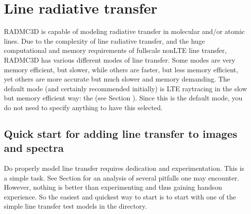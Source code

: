 \documentclass[letterpaper,10pt,english]{sphinxmanual}
\begin{document}
\chapter{Line radiative transfer}
\label{\detokenize{lineradtrans:line-radiative-transfer}}\label{\detokenize{lineradtrans:chap-line-transfer}}\label{\detokenize{lineradtrans::doc}}
RADMC\sphinxhyphen{}3D is capable of modeling radiative transfer in molecular and/or
atomic lines. Due to the complexity of line radiative transfer, and the huge
computational and memory requirements of full\sphinxhyphen{}scale non\sphinxhyphen{}LTE line transfer,
RADMC\sphinxhyphen{}3D has various different modes of line transfer. Some modes are very
memory efficient, but slower, while others are faster, but less memory
efficient, yet others are more accurate but much slower and memory
demanding. The default mode (and certainly recommended initially) is LTE
ray\sphinxhyphen{}tracing in the slow but memory efficient way: the 
(see Section {\hyperref[\detokenize{lineradtrans:sec-line-trans-modes}]{}}). Since this is the default mode,
you do not need to specify anything to have this selected.


\section{Quick start for adding line transfer to images and spectra}
\label{\detokenize{lineradtrans:quick-start-for-adding-line-transfer-to-images-and-spectra}}
Do properly model line transfer requires dedication and experimentation.
This is  a simple task. See Section {\hyperref[\detokenize{lineradtrans:sec-lines-pitfalls}]{}} for an
analysis of several pitfalls one may encounter. However, nothing is better
than experimenting and thus gaining hands\sphinxhyphen{}on experience. So the easiest and
quickest way to start is to start with one of the simple line transfer test
models in the  directory.
\end{document}

